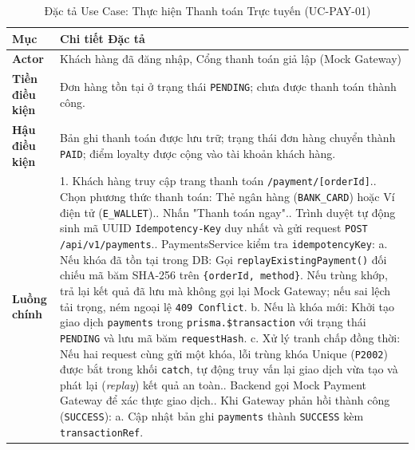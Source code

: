 \begin{table}[H]
\centering
\small
\caption{Đặc tả Use Case: Thực hiện Thanh toán Trực tuyến (UC-PAY-01)}
\label{tab:uc-spec-payment}
\begin{tabularx}{\textwidth}{p{2.8cm}X}
\toprule
\textbf{Mục} & \textbf{Chi tiết Đặc tả} \\
\midrule
\textbf{Actor} & Khách hàng đã đăng nhập, Cổng thanh toán giả lập (Mock Gateway) \\
\midrule
\textbf{Tiền điều kiện} & Đơn hàng tồn tại ở trạng thái \texttt{PENDING}; chưa được thanh toán thành công. \\
\midrule
\textbf{Hậu điều kiện} & Bản ghi thanh toán được lưu trữ; trạng thái đơn hàng chuyển thành \texttt{PAID}; điểm loyalty được cộng vào tài khoản khách hàng. \\
\midrule
\textbf{Luồng chính} & 
1. Khách hàng truy cập trang thanh toán \texttt{/payment/[orderId]}.\newline
2. Chọn phương thức thanh toán: Thẻ ngân hàng (\texttt{BANK\_CARD}) hoặc Ví điện tử (\texttt{E\_WALLET}).\newline
3. Nhấn "Thanh toán ngay".\newline
4. Trình duyệt tự động sinh mã UUID \texttt{Idempotency-Key} duy nhất và gửi request \texttt{POST /api/v1/payments}.\newline
5. PaymentsService kiểm tra \texttt{idempotencyKey}:\newline
\quad a. Nếu khóa đã tồn tại trong DB: Gọi \texttt{replayExistingPayment()} đối chiếu mã băm SHA-256 trên \texttt{\{orderId, method\}}. Nếu trùng khớp, trả lại kết quả đã lưu mà không gọi lại Mock Gateway; nếu sai lệch tải trọng, ném ngoại lệ \texttt{409 Conflict}.\newline
\quad b. Nếu là khóa mới: Khởi tạo giao dịch \texttt{payments} trong \texttt{prisma.\$transaction} với trạng thái \texttt{PENDING} và lưu mã băm \texttt{requestHash}.\newline
\quad c. Xử lý tranh chấp đồng thời: Nếu hai request cùng gửi một khóa, lỗi trùng khóa Unique (\texttt{P2002}) được bắt trong khối \texttt{catch}, tự động truy vấn lại giao dịch vừa tạo và phát lại (\textit{replay}) kết quả an toàn.\newline
6. Backend gọi Mock Payment Gateway để xác thực giao dịch.\newline
7. Khi Gateway phản hồi thành công (\texttt{SUCCESS}):\newline
\quad a. Cập nhật bản ghi \texttt{payments} thành \texttt{SUCCESS} kèm \texttt{transactionRef}.\newline

\end{tabularx}
\end{table}
